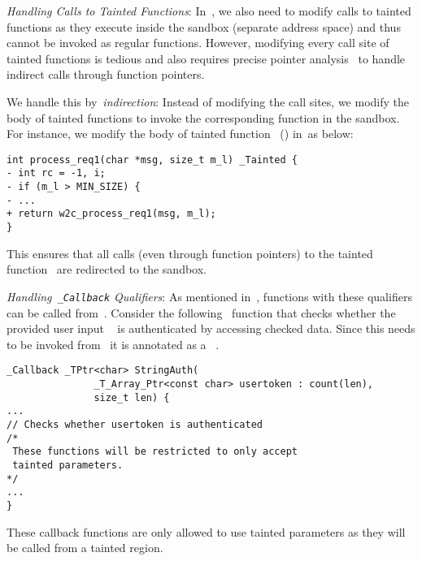 \iffalse
\noindent\emph{Handling Tainted Buffers in~\cregion}:
All buffers that are marked as tainted in~\cregion should be manually allocated in the sandbox. For instance,~\code{buff} in function~\code{handle_request} of~\lst{lst:final}.
We perform source rewriting and make the buffer into a pointer variable and allocate the corresponding number of bytes using the sandbox-specific allocator. For instance, we perform the following rewriting for~\code{buff} in~\lst{lst:final} with WASM sandbox.
\begin{verbatim}
- char buff[MAX_MSG_SIZE] __Tainted;
+ _TPtr<char> buff = (_TPtr<char>)t_malloc(MAX_MSG_SIZE);  
\end{verbatim}
Note that we also add the necessary deallocator calls at function exit points.
\fi

\noindent\emph{Handling Calls to Tainted Functions}:
In~\cregion, we also need to modify calls to tainted functions as they execute inside the sandbox (separate address space) and thus cannot be invoked as regular functions.
However, modifying every call site of tainted functions is tedious and also requires precise pointer analysis~\cite{milanova2002precise} to handle indirect calls through function pointers.

We handle this by~\emph{indirection}: Instead of modifying the call sites, we modify the body of tainted functions to invoke the corresponding function in the sandbox.
For instance, we modify the body of tainted function~ () in~\cregion as below:
\begin{verbatim}
int process_req1(char *msg, size_t m_l) _Tainted {
- int rc = -1, i;
- if (m_l > MIN_SIZE) {
- ...
+ return w2c_process_req1(msg, m_l);
}
\end{verbatim}
This ensures that all calls (even through function pointers) to the tainted function~ are redirected to the sandbox.

\noindent\emph{Handling~\texttt{\_Callback} Qualifiers}:
As mentioned in~, functions with these qualifiers can be called from~\ucregion.
Consider the following~ function that checks whether the provided user input ~ is authenticated by accessing checked data. Since this needs to be invoked from ~\ucregion it is annotated as a ~.
\begin{verbatim}
_Callback _TPtr<char> StringAuth(
               _T_Array_Ptr<const char> usertoken : count(len),
               size_t len) {
...
// Checks whether usertoken is authenticated
/*
 These functions will be restricted to only accept
 tainted parameters.
*/
...
}
\end{verbatim}
These callback functions are only allowed to use tainted parameters as they will be called from a tainted region.


